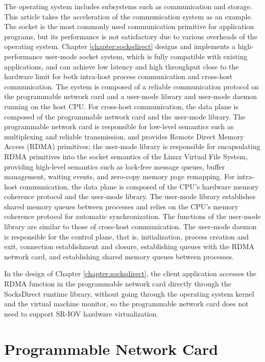 The operating system includes subsystems such as communication and storage. This article takes the acceleration of the communication system as an example. The socket is the most commonly used communication primitive for application programs, but its performance is not satisfactory due to various overheads of the operating system.
Chapter \ref{chapter:socksdirect} designs and implements a high-performance user-mode socket system, which is fully compatible with existing applications, and can achieve low latency and high throughput close to the hardware limit for both intra-host process communication and cross-host communication.
The system is composed of a reliable communication protocol on the programmable network card and a user-mode library and user-mode daemon running on the host CPU.
For cross-host communication, the data plane is composed of the programmable network card and the user-mode library. The programmable network card is responsible for low-level semantics such as multiplexing and reliable transmission, and provides Remote Direct Memory Access (RDMA) primitives; the user-mode library is responsible for encapsulating RDMA primitives into the socket semantics of the Linux Virtual File System, providing high-level semantics such as lock-free message queues, buffer management, waiting events, and zero-copy memory page remapping.
For intra-host communication, the data plane is composed of the CPU's hardware memory coherence protocol and the user-mode library. The user-mode library establishes shared memory queues between processes and relies on the CPU's memory coherence protocol for automatic synchronization. The functions of the user-mode library are similar to those of cross-host communication.
The user-mode daemon is responsible for the control plane, that is, initialization, process creation and exit, connection establishment and closure, establishing queues with the RDMA network card, and establishing shared memory queues between processes.

In the design of Chapter \ref{chapter:socksdirect}, the client application accesses the RDMA function in the programmable network card directly through the SocksDirect runtime library, without going through the operating system kernel and the virtual machine monitor, so the programmable network card does not need to support SR-IOV hardware virtualization.



\section{Programmable Network Card}

